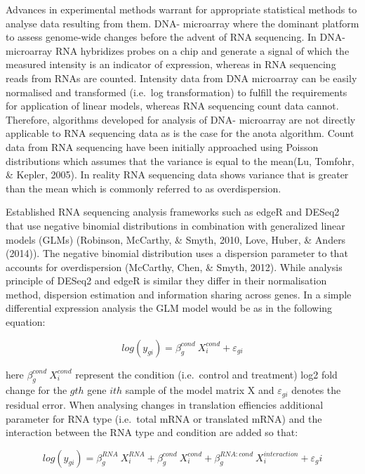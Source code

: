 \documentclass[12pt,openany]{book}
\begin{document}
Advances in experimental methods warrant for appropriate statistical
methods to analyse data resulting from them. DNA- microarray where the
dominant platform to assess genome-wide changes before the advent of RNA
sequencing. In DNA- microarray RNA hybridizes probes on a chip and
generate a signal of which the measured intensity is an indicator of
expression, whereas in RNA sequencing reads from RNAs are counted.
Intensity data from DNA microarray can be easily normalised and
transformed (i.e.~log transformation) to fulfill the requirements for
application of linear models, whereas RNA sequencing count data cannot.
Therefore, algorithms developed for analysis of DNA- microarray are not
directly applicable to RNA sequencing data as is the case for the anota
algorithm. Count data from RNA sequencing have been initially approached
using Poisson distributions which assumes that the variance is equal to
the mean(Lu, Tomfohr, \& Kepler, 2005). In reality RNA sequencing data
shows variance that is greater than the mean which is commonly referred
to as overdispersion.

Established RNA sequencing analysis frameworks such as edgeR and DESeq2
that use negative binomial distributions in combination with generalized
linear models (GLMs) (Robinson, McCarthy, \& Smyth, 2010, Love, Huber,
\& Anders (2014)). The negative binomial distribution uses a dispersion
parameter to that accounts for overdispersion (McCarthy, Chen, \& Smyth,
2012). While analysis principle of DESeq2 and edgeR is similar they
differ in their normalisation method, dispersion estimation and
information sharing across genes. In a simple differential expression
analysis the GLM model would be as in the following equation:

\[log(y_{gi}) = \beta_g^{cond}\ X_i^{cond} + \varepsilon_{gi}\]

here \(\beta_g^{cond}\ X_i^{cond}\) represent the condition
(i.e.~control and treatment) log2 fold change for the \(gth\) gene
\(ith\) sample of the model matrix X and \(\varepsilon_{gi}\) denotes
the residual error. When analysing changes in translation effiencies
additional parameter for RNA type (i.e.~total mRNA or translated mRNA)
and the interaction between the RNA type and condition are added so
that:

\[log(y_{gi}) = \beta_g^{RNA}\ X_i^{RNA}+ \beta_g^{cond}\ X_i^{cond} + \beta_g^{RNA:cond}\ X_i^{interaction} + \varepsilon_gi\]
\end{document}
